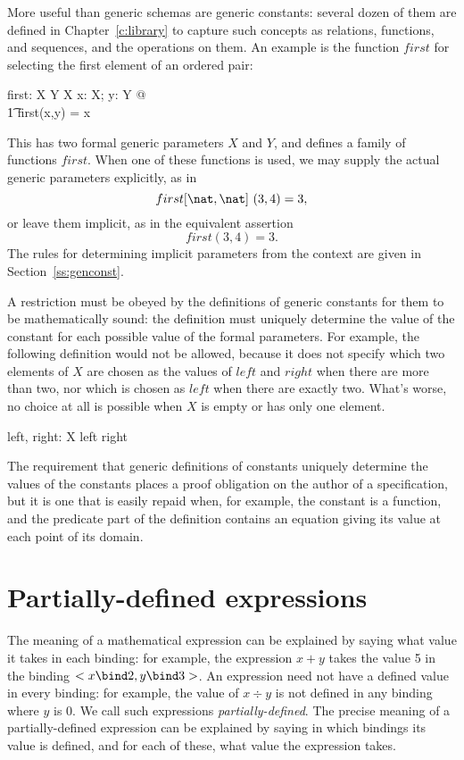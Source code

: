 More useful than generic schemas are generic
constants: several dozen of them
are defined in Chapter~\ref{c:library} to capture such concepts
as relations, functions, and sequences, and the operations on them.
An example is the function $first$ for selecting the 
first element of an ordered pair:
\begin{gendef}[X,Y]
        first: X \cross Y \fun X
\where
        \forall x: X; y: Y @ \\
\t1		first(x,y) = x
\end{gendef}
This has two formal generic parameters $X$ and $Y$, and defines
a family of functions $first$. When one of these functions is used,
we may supply the actual generic parameters explicitly, as in
\[ first[\nat,\nat]~(3,4) = 3, \]
or leave them implicit,
as in the equivalent assertion
\[ first(3,4) = 3. \]
The rules for determining implicit parameters from the context
are given in Section~\ref{ss:genconst}.

A restriction must be obeyed by the definitions of generic constants
for them to be mathematically sound: the definition must uniquely
determine the
value of the constant for each possible value of the formal
parameters. For example, the following definition would not be
allowed, because it does not specify which two elements of $X$ are
chosen as the values of $left$ and $right$ when there are more than
two, nor which is chosen as $left$ when there are exactly two.
What's worse, no choice at all is possible when $X$ is empty or has
only one element.
\begin{gendef}[X]
        left, right: X
\where
        left \neq right
\end{gendef}
The requirement that generic definitions of constants uniquely
determine the values of the constants places a proof obligation
on the author of a specification, but it is one that is easily
repaid when, for example, the constant is a function, and the
predicate part of the definition contains an equation giving its
value at each point of its domain.

\section{Partially-defined expressions}\label{s:partial}

The meaning of a mathematical expression can be explained by saying
what value it takes in each binding: for example, the expression 
$x + y$ takes the value 5 in the binding $<x \bind 2, y \bind 3>$.
An expression need not have a defined value in every binding: for
example, the value of $x \div y$ is not defined in any binding where
$y$ is 0. We call such expressions {\em
partially-defined}.%
The precise meaning of a partially-defined expression can be
explained by saying in which bindings its value is defined, and for
each of these, what value the expression takes.

